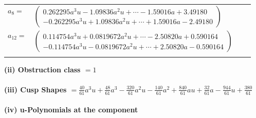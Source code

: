 \documentclass[1p]{elsarticle_modified}
\theoremstyle{definition}
\begin{document}
\begin{tabular}{m{7pt} m{180pt} m{7pt} m{180pt} }
\flushright $a_{8}=$&$\begin{pmatrix}0.262295 a^{3} u-1.09836 a^{2} u+\cdots-1.59016 a+3.49180\\-0.262295 a^{3} u+1.09836 a^{2} u+\cdots+1.59016 a-2.49180\end{pmatrix}$ \\
\flushright $a_{12}=$&$\begin{pmatrix}0.114754 a^{3} u+0.0819672 a^{2} u+\cdots-2.50820 a+0.590164\\-0.114754 a^{3} u-0.0819672 a^{2} u+\cdots+2.50820 a-0.590164\end{pmatrix}$\\&\end{tabular}
\flushleft \textbf{(ii) Obstruction class $= 1$}\\~\\
\flushleft \textbf{(iii) Cusp Shapes $= \frac{40}{61} a^3 u+\frac{48}{61} a^3-\frac{320}{61} a^2 u-\frac{140}{61} a^2+\frac{840}{61} a u+\frac{32}{61} a-\frac{944}{61} u+\frac{380}{61}$}\\~\\
\newpage\renewcommand{\arraystretch}{1}
\flushleft \textbf{(iv) u-Polynomials at the component}\newline \\
\end{document}
